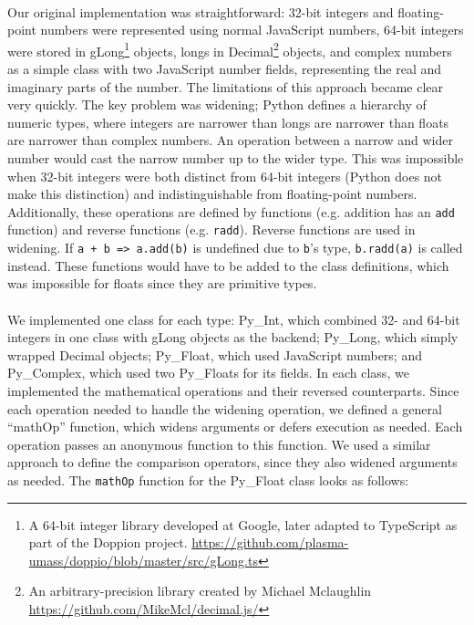 \documentclass{article}
\begin{document}
\paragraph{}
Our original implementation was straightforward: 32-bit integers and floating-point numbers were represented using normal JavaScript numbers, 64-bit integers were stored in gLong\footnote{A 64-bit integer library developed at Google, later adapted to TypeScript as part of the Doppion project. \url{https://github.com/plasma-umass/doppio/blob/master/src/gLong.ts}} objects, longs in Decimal\footnote{An arbitrary-precision library created by Michael Mclaughlin \url{https://github.com/MikeMcl/decimal.js/}} objects, and complex numbers as a simple class with two JavaScript number fields, representing the real and imaginary parts of the number. The limitations of this approach became clear very quickly. The key problem was widening; Python defines a hierarchy of numeric types, where integers are narrower than longs are narrower than floats are narrower than complex numbers. An operation between a narrow and wider number would cast the narrow number up to the wider type. This was impossible when 32-bit integers were both distinct from 64-bit integers (Python does not make this distinction) and indistinguishable from floating-point numbers. Additionally, these operations are defined by functions (e.g. addition has an \texttt{add} function) and reverse functions (e.g. \texttt{radd}). Reverse functions are used in widening. If \texttt{a + b => a.add(b)} is undefined due to \texttt{b}'s type, \texttt{b.radd(a)} is called instead. These functions would have to be added to the class definitions, which was impossible for floats since they are primitive types.

\paragraph{}
We implemented one class for each type: Py\_Int, which combined 32- and 64-bit integers in one class with gLong objects as the backend; Py\_Long, which simply wrapped Decimal objects; Py\_Float, which used JavaScript numbers; and Py\_Complex, which used two Py\_Floats for its fields. In each class, we implemented the mathematical operations and their reversed counterparts. Since each operation needed to handle the widening operation, we defined a general ``mathOp'' function, which widens arguments or defers execution as needed. Each operation passes an anonymous function to this function. We used a similar approach to define the comparison operators, since they also widened arguments as needed. The \texttt{mathOp} function for the Py\_Float class looks as follows:
\end{document}
